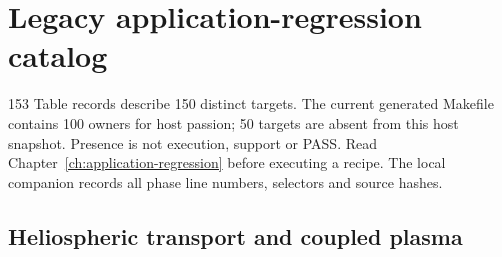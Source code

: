 \chapter{Legacy application-regression catalog}\label{ch:legacy-catalog}
153 Table records describe 150 distinct targets. The current generated Makefile contains 100 owners for host passion; 50 targets are absent from this host snapshot. Presence is not execution, support or PASS.
Read Chapter~\ref{ch:application-regression} before executing a recipe.
The local companion  records all phase line numbers, selectors and source hashes.
\section{Heliospheric transport and coupled plasma}
